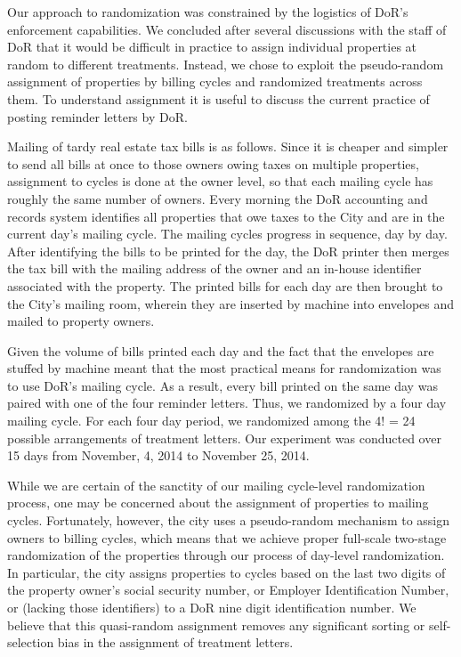 \documentclass[12pt,titlepage]{article}
\begin{document}
Our approach to randomization was constrained by the logistics of
DoR's enforcement capabilities. We concluded after several discussions
with the staff of DoR that it would be difficult in practice
to assign individual properties at random to different
treatments. Instead, we chose to exploit the pseudo-random assignment
of properties by billing cycles and randomized treatments across them.
To understand assignment it is useful to discuss the current
practice of posting reminder letters by DoR.

Mailing of tardy real estate tax bills is as follows.  Since it is
cheaper and simpler to send all bills at once to those owners owing
taxes on multiple properties, assignment to cycles is done at the
owner level, so that each mailing cycle has roughly the same number of
owners.  Every morning the DoR accounting and records system
identifies all properties that owe taxes to the City and are in the
current day's mailing cycle.  The mailing cycles progress in sequence,
day by day.  After identifying the bills to be printed for the day,
the DoR printer then merges the tax bill with the mailing address of
the owner and an in-house identifier associated with the property.
The printed bills for each day are then brought to the City's mailing
room, wherein they are inserted by machine into envelopes and mailed
to property owners.
	
Given the volume of bills printed each day and the fact that the 
envelopes are stuffed by machine meant that the most practical means 
for randomization was to use DoR's mailing cycle.  As a result, 
every bill printed on the same day was paired with one of the four 
reminder letters.  Thus, we randomized by a four day mailing cycle.  
For each four day period, we randomized among the 4! = 24 possible 
arrangements of treatment letters.  Our experiment was conducted 
over 15 days from  November, 4, 2014 to November 25, 2014. 

While we are certain of the sanctity of our mailing cycle-level
randomization process, one may be concerned about the assignment of
properties to mailing cycles. Fortunately, however, the city uses a
pseudo-random mechanism to assign owners to billing cycles, which
means that we achieve proper full-scale two-stage randomization of the
properties through our process of day-level randomization. In
particular, the city assigns properties to cycles based on the last
two digits of the property owner's social security number, or Employer
Identification Number, or (lacking those identifiers) to a DoR nine
digit identification number.  We believe that this quasi-random
assignment removes any significant sorting or self-selection bias in
the assignment of treatment letters.
\end{document}
